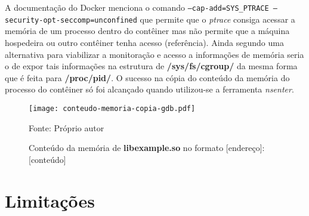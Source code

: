 A documentação do Docker \cite{capabilities} menciona o comando \texttt{--cap-add=SYS_PTRACE --security-opt-seccomp=unconfined} que permite que o \textit{ptrace} consiga acessar a memória de um processo dentro do contêiner mas não permite que a máquina hospedeira ou outro contêiner tenha acesso (referência).
%
Ainda segundo \cite{cgroupsxptrace} uma alternativa para viabilizar a monitoração e acesso a informações de memória seria o de expor tais informações na estrutura de \textbf{/sys/fs/cgroup/} da mesma forma que é feita para \textbf{/proc/pid/}.
%
O sucesso na cópia do conteúdo da memória do processo do contêiner só foi alcançado quando utilizou-se a ferramenta \textit{nsenter}.
%

\begin{figure}[htb!]
\footnotesize
\caption{Conteúdo da memória de \textbf{libexample.so} no formato [endereço]: [conteúdo]}
\texttt{[image: conteudo-memoria-copia-gdb.pdf]}
\centering
\label{fig:conteudo-memoria-copia-gdb}
\begin{center}
Fonte: Próprio autor 
\end{center}
\end{figure}





\section{Limitações}
\label{sec:proposta-limit}

